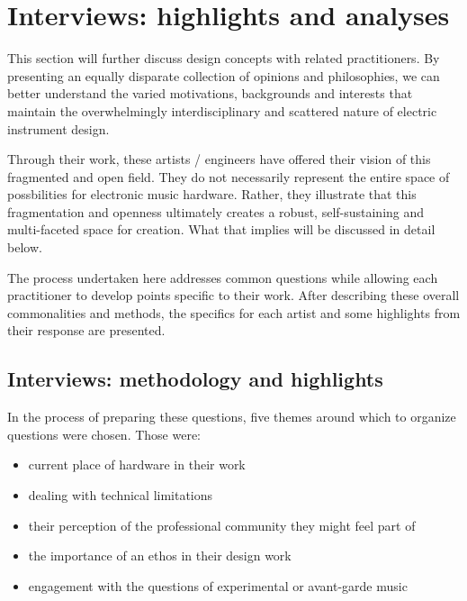 \chapter{Interviews: highlights and analyses}\label{interviews}
This section will further discuss design concepts with related practitioners. By presenting an equally disparate collection of opinions and philosophies, we can better understand the varied motivations, backgrounds and interests that maintain the overwhelmingly interdisciplinary and scattered nature of electric instrument design. 

Through their work, these artists / engineers have offered their vision of this fragmented and open field. They do not necessarily represent the entire space of possbilities for electronic music hardware. Rather, they illustrate that this fragmentation and openness ultimately creates a robust, self-sustaining and multi-faceted space for creation. What that implies will be discussed in detail below.

The process undertaken here addresses common questions while allowing each practitioner to develop points specific to their work. After describing these overall commonalities and methods, the specifics for each artist and some highlights from their response are presented. 

\section{Interviews: methodology and highlights}

In the process of preparing these questions, five themes around which to organize questions were chosen. Those were: 

\begin{itemize}
	\item current place of hardware in their work 
	\item dealing with technical limitations
	\item their perception of the professional community they might feel part of
	\item the importance of an ethos in their design work
	\item engagement with the questions of experimental or avant-garde music 
	\end{itemize}

